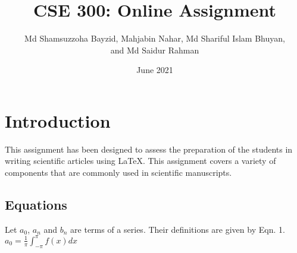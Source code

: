 \documentclass{article}
\title{CSE 300: Online Assignment}
\author{
	Md Shamsuzzoha Bayzid, Mahjabin Nahar, Md Shariful Islam Bhuyan,\\
	and Md Saidur Rahman
}
\date{June 2021}
\begin{document}
	
\maketitle

\section{Introduction}

This assignment has been designed to assess the preparation of the students in writing scientific articles using \LaTeX. This assignment covers a variety of components that are commonly used in scientific manuscripts.


\subsection{Equations}


Let $a_0$, $a_n$ and $b_n$ are terms of a series. Their definitions are given by Eqn. 1.
\vspace{2mm}
$
a_0 
=
\frac{1}{\pi} \int_{-\pi}^{\pi}f(x)dx
$
	
	
\end{document}

